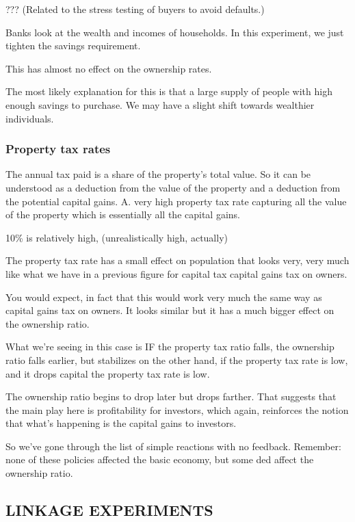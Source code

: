 \documentclass[]{article}
\begin{document}
??? (Related to the stress testing of buyers to avoid defaults.)

Banks look at the wealth and incomes of households. In this experiment, we just tighten the savings requirement.

This has almost no effect on the ownership rates.

The most likely explanation for this is that a large supply of people with high enough savings to purchase. We may have a slight shift towards wealthier individuals.

\subsubsection{Property tax rates}

The annual tax paid is a share of the property’s total value. So it can be understood as a deduction from the value of the property and a deduction from the potential capital gains. A. very high property tax rate capturing all the value of the property which is essentially all the capital gains.

10\% is relatively high, (unrealistically high, actually)

The property tax rate has a small effect on population that looks very, very much like what we have in a previous figure for capital tax capital gains tax on owners.

You would expect, in fact that this would work very much the same way as capital gains tax on owners. It looks similar but it has a much bigger effect on the ownership ratio.

What we’re seeing in this case is IF the property tax ratio falls, the ownership ratio falls earlier, but stabilizes on the other hand, if the property tax rate is low, and it drops capital the property tax rate is low.

The ownership ratio begins to drop later but drops farther.  That suggests that the main play here is profitability for investors, which again, reinforces the notion that what’s happening is the capital gains to investors.

So we’ve gone through the list of simple reactions with no feedback. Remember: none of these policies affected the basic economy, but some ded affect the ownership ratio.

\subsection{LINKAGE EXPERIMENTS}
\end{document}
